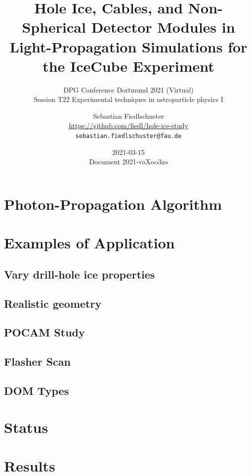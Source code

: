\documentclass[green, 12pt]{beamer}
\title[Hole Ice, Cables, and Non-Spherical Detector Modules in Light-Propagation Simulations]{Hole Ice, Cables, and Non-Spherical Detector Modules in Light-Propagation Simulations for the IceCube Experiment}
\subtitle{DPG Conference Dortmund 2021 (Virtual)\\ Session T22 Experimental techniques in astroparticle physics I}
\date{2021-03-15 \\ \vspace*{2mm}\tiny{Document 2021-voXoo3zo} \normalsize}
\author[Sebastian Fiedlschuster, ECAP Erlangen, 2021-03-15]{Sebastian Fiedlschuster \\ \tiny{\url{https://github.com/fiedl/hole-ice-study}} \\ \tiny\texttt{sebastian.fiedlschuster@fau.de}}
\institute{Erlangen Centre for Astroparticle Physics}
\newif\ifplacelogo %
\begin{document}



\placelogofalse

  
  
  
%  

\section{Photon-Propagation Algorithm}
  

\section{Examples of Application}
\subsection{Vary drill-hole ice properties}
  
\subsection{Realistic geometry}
  
\subsection{POCAM Study}
  
\subsection{Flasher Scan}
  
  
\subsection{DOM Types}
  

\section{Status}
  
\section{Results}
  
\end{document}
